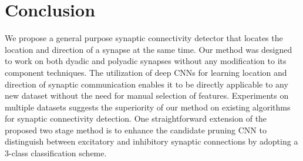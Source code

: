 \documentclass{llncs}
\begin{document}
\section{Conclusion} 
We propose a general purpose synaptic connectivity detector that locates the location and direction of a synapse at the same time. Our method was designed to work on both dyadic and polyadic synapses without any modification to its component techniques. The utilization of deep CNNs for learning location and direction of synaptic communication enables it to be directly applicable to any new dataset without the need for manual selection of features. Experiments on multiple datasets suggests the superiority of our method on existing algorithms for synaptic connectivity detection. One straightforward extension of the proposed two stage method is to enhance the candidate pruning CNN to distinguish between excitatory and inhibitory synaptic connections by adopting a 3-class classification scheme.
{\scriptsize


}
\end{document}
